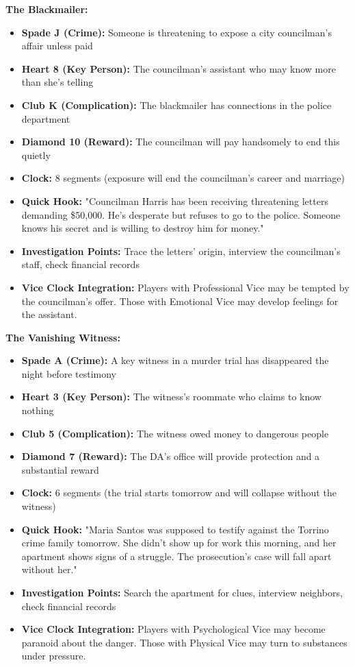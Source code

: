 \documentclass[11pt]{article}
\begin{document}
\textbf{The Blackmailer:}
\begin{itemize}
    \item \textbf{Spade J (Crime):} Someone is threatening to expose a city councilman's affair unless paid
    \item \textbf{Heart 8 (Key Person):} The councilman's assistant who may know more than she's telling
    \item \textbf{Club K (Complication):} The blackmailer has connections in the police department
    \item \textbf{Diamond 10 (Reward):} The councilman will pay handsomely to end this quietly
    \item \textbf{Clock:} 8 segments (exposure will end the councilman's career and marriage)
    \item \textbf{Quick Hook:} "Councilman Harris has been receiving threatening letters demanding \$50,000. He's desperate but refuses to go to the police. Someone knows his secret and is willing to destroy him for money."
    \item \textbf{Investigation Points:} Trace the letters' origin, interview the councilman's staff, check financial records
    \item \textbf{Vice Clock Integration:} Players with Professional Vice may be tempted by the councilman's offer. Those with Emotional Vice may develop feelings for the assistant.
\end{itemize}

\textbf{The Vanishing Witness:}
\begin{itemize}
    \item \textbf{Spade A (Crime):} A key witness in a murder trial has disappeared the night before testimony
    \item \textbf{Heart 3 (Key Person):} The witness's roommate who claims to know nothing
    \item \textbf{Club 5 (Complication):} The witness owed money to dangerous people
    \item \textbf{Diamond 7 (Reward):} The DA's office will provide protection and a substantial reward
    \item \textbf{Clock:} 6 segments (the trial starts tomorrow and will collapse without the witness)
    \item \textbf{Quick Hook:} "Maria Santos was supposed to testify against the Torrino crime family tomorrow. She didn't show up for work this morning, and her apartment shows signs of a struggle. The prosecution's case will fall apart without her."
    \item \textbf{Investigation Points:} Search the apartment for clues, interview neighbors, check financial records
    \item \textbf{Vice Clock Integration:} Players with Psychological Vice may become paranoid about the danger. Those with Physical Vice may turn to substances under pressure.
\end{itemize}
\end{document}
